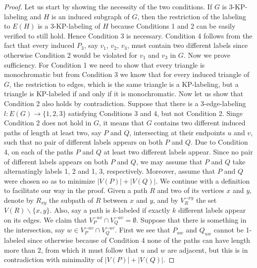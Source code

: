 \documentclass[12pt,a4paper,titlepage,openany]{report}
\begin{document}
\begin{proof}
Let us start by showing the necessity of the two conditions. If $G$ is 3-KP-labeling and $H$ is an induced subgraph of $G$, then the restriction of the labeling to $E(H)$ is a 3-KP-labeling of $H$ because Conditions 1 and 2 can be easily verified to still hold. Hence Condition 3 is necessary. Condition 4 follows from the fact that every induced $P_3$, say $v_1$, $v_2$, $v_3$, must contain two different labels since otherwise Condition 2 would be violated for $v_1$ and $v_3$ in $G$.\newline\medskip 
Now we prove sufficiency. For Condition 1 we need to show that every triangle is monochromatic but from Condition 3 we know that for every induced triangle of $G$, the restriction to edges, which is the same triangle is a KP-labeling, but a triangle is KP-labeled if and only if it is monochromatic.\newline
Now let us show that Condition 2 also holds by contradiction.\newline
Suppose  that there is a 3-edge-labeling $l:E(G)\rightarrow \{1,2,3\}$ satisfying Conditions 3 and 4, but not Condition 2. Singe Condition 2 does not hold in $G$, it means that $G$ contains two different induced paths of length at least two, say $P$ and $Q$, intersecting at their endpoints $u$ and $v$, such that no pair of different labels appears on both $P$ and $Q$.\newline
Due to Condition 4, on each of the paths $P$ and $Q$ at least two different labels appear. Since no pair of different labels appears on both $P$ and $Q$, we may assume that $P$ and $Q$ take alternatingly labels 1, 2 and 1, 3, respectively. Moreover, assume that $P$ and $Q$ were chosen so as to minimize $|V(P)|+|V(Q)|$.\newline
We continue with a definition to facilitate our way in the proof. Given a path $R$ and two of its vertices $x$ and $y$, denote by $R_{xy}$ the subpath of $R$ between
$x$ and $y$, and by $V_R^{-xy}$ the set $V(R)\backslash \{x,y\}$. Also, say a path is $k$-labeled if exactly $k$
different labels appear on its edges.\newline
We claim that $V_P^{-uv} \cap V_Q^{-uv} = \emptyset$. Suppose that there is something in the intersection, say $w\in V_P^{-uv} \cap V_Q^{-uv}$. First we see that $P_{uw}$ and $Q_{uw}$ cannot be 1-labeled since otherwise because of Condition 4 none of the paths can have length more than 2, from which it must follow that $u$ and $w$ are adjacent, but this is in contradiction with minimality of $|V(P)|+|V(Q)|$. 


\end{proof}
\end{document}
